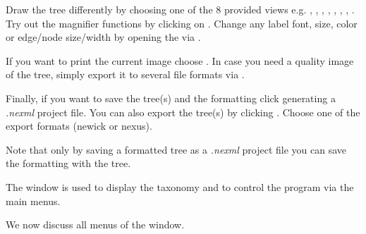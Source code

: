 \documentclass[11pt]{article}
\begin{document}
Draw the tree differently by choosing one of the 8 provided views e.g. 
,
,
,
,
,
,
,
.
Try out the magnifier functions by clicking on .
Change any label font, size, color or edge/node size/width by opening the  
via .

If you want to print the current image
choose . In case you need a quality image of the tree, simply export it to several 
file formats via .

Finally, if you want to save the tree(s) and the formatting click  generating a \textit{.nexml} project file.
You can also export the tree(s) by clicking . Choose one of the export formats (newick or nexus).

Note that only by saving a formatted tree as a \textit{.nexml} project file
you can save the formatting with the tree.

The  window is used to display the taxonomy and to
control the program via the main menus.

We now discuss all menus of the  window. 
\end{document}
